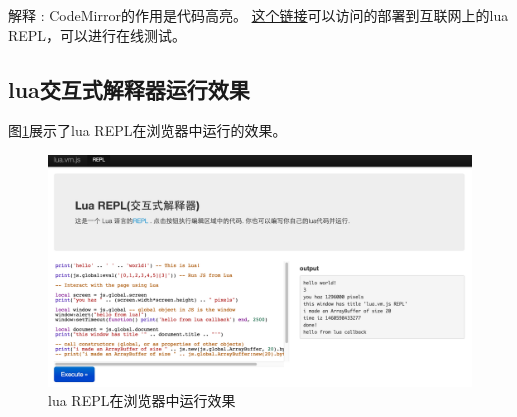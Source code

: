 {\heiti 解释 : } CodeMirror的作用是代码高亮。 \href{http://aicdg.com/emscriptenDemos/lua/REPL/repl.html}{这个链接}可以访问的部署到互联网上的lua REPL，可以进行在线测试。

\subsection{lua交互式解释器运行效果}

图\ref{lua-vm-repl}展示了lua REPL在浏览器中运行的效果。

\begin{figure}[h!] %
    \centering
    \includegraphics[width=400bp]{figure/pic/lua-vm-repl.png}
    \caption{lua REPL在浏览器中运行效果}
    \label{lua-vm-repl}
\end{figure}